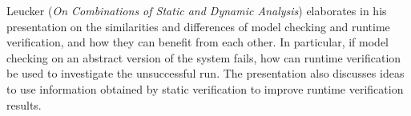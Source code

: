 

Leucker
\cite{isola-2016-leucker}
({\em On Combinations of Static and Dynamic Analysis})
elaborates in his presentation on the similarities and differences of
model checking and runtime verification, and how they can benefit
from each other. In particular, if model checking on an abstract
version of the system fails, how can runtime verification be used to
investigate the unsuccessful run. The presentation also discusses ideas
to use information obtained by static verification to improve runtime
verification results.